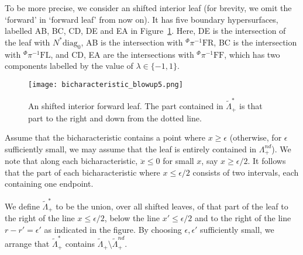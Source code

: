 \documentclass[10pt, a4paper, twoside]{amsart}
\numberwithin{equation}{section}
\theoremstyle{remark}
\begin{document}
To be more precise, we consider an shifted interior leaf (for brevity, we omit the `forward' in `forward leaf' from now on). It has five boundary hypersurfaces, labelled AB, BC, CD, DE and EA in Figure~\ref{fig:intleaf}.  Here, DE is the intersection of the leaf with $N^* {\mathrm{diag}_0}$, AB is the intersection with ${}^\Phi\pi^{-1} {\mathrm{FR}}$,  BC is the intersection with ${}^\Phi\pi^{-1} {\mathrm{FL}}$, and CD, EA are the intersections with ${}^\Phi\pi^{-1} {\mathrm{FF}}$, which has two components labelled by the value of $\lambda \in \{ -1, 1 \}$. 

\begin{center}\begin{figure}
\texttt{[image: bicharacteristic\_blowup5.png]}
\caption{\label{fig:intleaf}An shifted interior forward leaf. The part contained in ${\tilde \Lambda}_+^*$ is that part to the right and down from the dotted line.}
\end{figure}
\end{center}

Assume that the bicharacteristic contains a point where $x \geq \epsilon$ (otherwise, for $\epsilon$ sufficiently small, we may assume that the leaf is entirely contained in $\Lambda_+^{nd}$). 
We note that along each bicharacteristic, $\ddot x \leq 0$ for small $x$, say $x \geq \epsilon/2$. It follows that the part of each bicharacteristic where $x \leq \epsilon/2$ consists of two intervals, each containing one endpoint. 

We define ${\tilde \Lambda}_+^*$ to be the union, over all shifted leaves, of that part of the leaf to the right of the line $x \leq \epsilon/2$, below the line $x' \leq \epsilon/2$ and to the right of the line $r - r' = \epsilon'$ as indicated in the figure. By choosing $\epsilon, \epsilon'$ sufficiently small,  we arrange that ${\tilde \Lambda}_+^*$ contains ${\tilde \Lambda}_+ \setminus {\tilde \Lambda}_+^{nd}$. 
\end{document}
